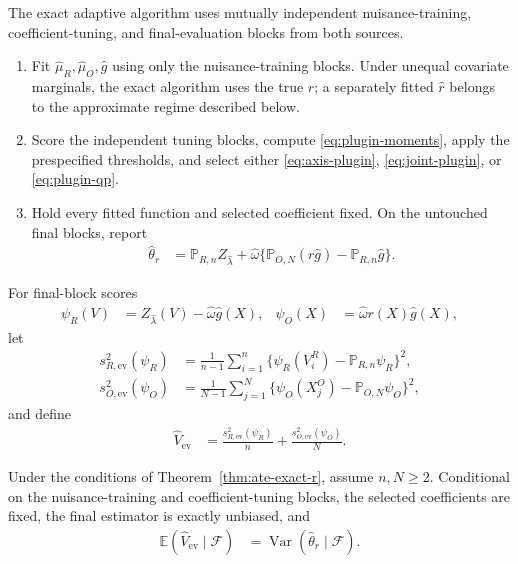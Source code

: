 The exact adaptive algorithm uses mutually independent nuisance-training, coefficient-tuning, and final-evaluation blocks from both sources.

\begin{enumerate}[label=\arabic*.]
\item Fit $\widehat\mu_R,\widehat\mu_O,\widehat{g}$ using only the nuisance-training blocks. Under unequal covariate marginals, the exact algorithm uses the true $r$; a separately fitted $\widehat r$ belongs to the approximate regime described below.
\item Score the independent tuning blocks, compute \eqref{eq:plugin-moments}, apply the prespecified thresholds, and select either \eqref{eq:axis-plugin}, \eqref{eq:joint-plugin}, or \eqref{eq:plugin-qp}.
\item Hold every fitted function and selected coefficient fixed. On the untouched final blocks, report
\begin{align}
\widehat\theta_r
&=
\mathbb P_{R,n}Z_{\widehat\lambda}
+
\widehat\omega
\{\mathbb P_{O,N}(r\widehat{g})-\mathbb P_{R,n}\widehat{g}\}.
\label{eq:honest-selected-estimator}
\end{align}
\end{enumerate}

For final-block scores
\begin{align}
\psi_R(V)
&=
Z_{\widehat\lambda}(V)-\widehat\omega \widehat{g}(X),
&
\psi_O(X)
&=
\widehat\omega r(X)\widehat{g}(X),
\end{align}
let
\begin{align}
s_{R,\mathrm{ev}}^2(\psi_R)
&=
\frac{1}{n-1}
\sum_{i=1}^n
\{\psi_R(V_i^R)-\mathbb P_{R,n}\psi_R\}^2,
\\
s_{O,\mathrm{ev}}^2(\psi_O)
&=
\frac{1}{N-1}
\sum_{j=1}^N
\{\psi_O(X_j^O)-\mathbb P_{O,N}\psi_O\}^2,
\end{align}
and define
\begin{align}
\widehat V_{\mathrm{ev}}
&=
\frac{s_{R,\mathrm{ev}}^2(\psi_R)}{n}
+
\frac{s_{O,\mathrm{ev}}^2(\psi_O)}{N}.
\label{eq:honest-variance-estimator}
\end{align}

\begin{proposition}
\label{prop:honest-variance}
Under the conditions of Theorem~\ref{thm:ate-exact-r}, assume $n,N\geq2$. Conditional on the nuisance-training and coefficient-tuning blocks, the selected coefficients are fixed, the final estimator is exactly unbiased, and
\begin{align}
\mathbb E(\widehat V_{\mathrm{ev}}\mid\mathcal F)
&=
\operatorname{Var}(\widehat\theta_r\mid\mathcal F).
\label{eq:honest-variance-unbiased}
\end{align}
\end{proposition}

